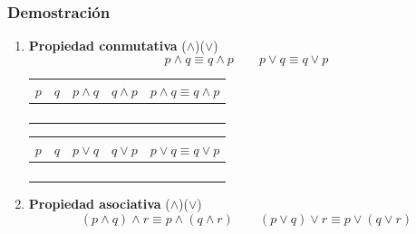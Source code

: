 \subsubsection{Demostración}
\begin{enumerate}[label=\alph*)]
\item \textbf{Propiedad conmutativa} ($\land$)($\vee$)
\[p \land q \equiv q \land p \qquad p \vee q \equiv q \vee p\]

\begin{center}
	\renewcommand{\arraystretch}{1.4}
	\begin{tabular}{|c|c|c|c||c|}
		\hline
		$p$ & $q$ & $p \land q$ & $q \land p$ & $p \land q \equiv q \land p$ \\
		\hline
		\V & \V & \V & \V & \V \\
		\hline
		\V & \F & \F & \F & \V \\
		\hline
		\F & \V & \F & \F & \V \\
		\hline
		\F & \F & \F & \F & \V \\
		\hline
	\end{tabular}
\end{center}

\begin{center}
	\renewcommand{\arraystretch}{1.4}
	\begin{tabular}{|c|c|c|c||c|}
		\hline
		$p$ & $q$ & $p \vee q$ & $q \vee p$ & $p \vee q \equiv q \vee p$ \\
		\hline
		\V & \V & \V & \V & \V \\
		\hline
		\V & \F & \V & \V & \V \\
		\hline
		\F & \V & \V & \V & \V \\
		\hline
		\F & \F & \F & \F & \V \\
		\hline
	\end{tabular}
\end{center}
\newpage
\item \textbf{Propiedad asociativa} ($\land$)($\vee$)
\[(p \land q) \land r \equiv p \land (q \land r) \qquad (p \vee q) \vee r \equiv p \vee (q \vee r)\]


\end{enumerate}
